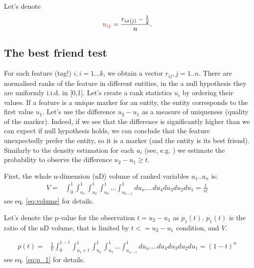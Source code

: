 \documentclass{llncs}
\begin{document}
Let's denote
\[
\textcolor{red}{u_{ij}} = \frac{r_{i\sigma(j)} - \frac{1}{2}}{n}.
\]





\subsection{The best friend test}




For each feature (tag!) $i,i=1\dots k$, we obtain a vector $r_{ij}, j=1..n$. There are normalised ranks of the feature in different entities, in the a null hypothesis they are uniformly i.i.d. in [0,1]. Let's create a rank statistics $u_i$ by ordering their values. If a feature is a unique marker for an entity, the entity corresponds to the first  value $u_1$. Let's use the difference $u_2-u_1$ as a measure of uniqueness (quality of the marker). Indeed, if we see that the difference is significantly higher than we can expect if null hypothesis holds, we can conclude that the feature unexpectedly prefer the entity, so it is a marker (and the entity is its best friend). Similarly to the density estimation for each $u_i$ (see, e.g. \cite{Gut:2009}) we estimate the probability to observe the difference $u_2 - u_1 \ge t$. 

First, the whole n-dimension (nD) volume of ranked variables $u_1 .. u_n$ is:
\begin{eqnarray*}
V = &\displaystyle \int_0^1\int_{u_1}^1\int_{u_2}^1\int_{u_3}^1...\int_{u_{n-1}}^1 du_n....du_4 du_3 du_2 du_1 =  \frac{1}{n!}
\end{eqnarray*}
see eq. \ref{eq:volume} for details.

Let's denote the p-value for the observation $t=u_2-u_1$ as $p_1(t)$. $p_1(t)$ is the ratio of the nD volume, that is limited by $t<=u_2-u_1$ condition, and $V$.

\begin{eqnarray*}
p(t) = & \displaystyle\frac{1}{V} \displaystyle \int_0^{1-t}\int_{{u_1}+t}^1\int_{u_2}^1\int_{u_3}^1...\int_{u_{n-1}}^1 du_n....du_4 du_3 du_2 du_1 = (1-t)^n
\end{eqnarray*}
see eq. \ref{eq:p_1} for details.
\end{document}
